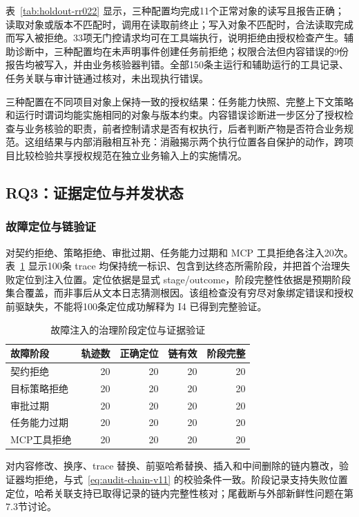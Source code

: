 表~\ref{tab:holdout-rr022} 显示，三种配置均完成11个正常对象的读写且报告正确；读取对象或版本不匹配时，调用在读取前终止；写入对象不匹配时，合法读取完成而写入被拒绝。33项无门控请求均可在工具端执行，说明拒绝由授权检查产生。辅助诊断中，三种配置均在未声明事件创建任务前拒绝；权限合法但内容错误的9份报告均被写入，并由业务核验器判错。全部150条主运行和辅助运行的工具记录、任务关联与审计链通过核对，未出现执行错误。

三种配置在不同项目对象上保持一致的授权结果：任务能力快照、完整上下文策略和运行时谓词均能实施相同的对象与版本约束。内容错误诊断进一步区分了授权检查与业务核验的职责，前者控制请求是否有权执行，后者判断产物是否符合业务规范。这组结果与内部消融相互补充：消融揭示两个执行位置各自保护的动作，跨项目比较检验共享授权规范在独立业务输入上的实施情况。

\subsection{RQ3：证据定位与并发状态}

\subsubsection{故障定位与链验证}

对契约拒绝、策略拒绝、审批过期、任务能力过期和 MCP 工具拒绝各注入20次。表~\ref{tab:rq3-trace-v11} 显示100条 trace 均保持统一标识、包含到达终态所需阶段，并把首个治理失败定位到注入位置。定位依据是显式 stage/outcome，阶段完整性依据是预期阶段集合覆盖，而非事后从文本日志猜测根因。该组检查没有穷尽对象绑定错误和授权前驱缺失，不能将100条定位成功解释为 I4 已得到完整验证。

\begin{table}[htbp]
\centering
\caption{故障注入的治理阶段定位与证据验证}
\label{tab:rq3-trace-v11}
\small
\begin{tabular}{lrrrr}
\toprule
故障阶段 & 轨迹数 & 正确定位 & 链有效 & 阶段完整 \\
\midrule
契约拒绝 & 20 & 20 & 20 & 20 \\
目标策略拒绝 & 20 & 20 & 20 & 20 \\
审批过期 & 20 & 20 & 20 & 20 \\
任务能力过期 & 20 & 20 & 20 & 20 \\
MCP工具拒绝 & 20 & 20 & 20 & 20 \\
\bottomrule
\end{tabular}
\end{table}

对内容修改、换序、trace 替换、前驱哈希替换、插入和中间删除的链内篡改，验证器均拒绝，与式~\eqref{eq:audit-chain-v11} 的校验条件一致。阶段记录支持失败位置定位，哈希关联支持已取得记录的链内完整性核对；尾截断与外部新鲜性问题在第7.3节讨论。

